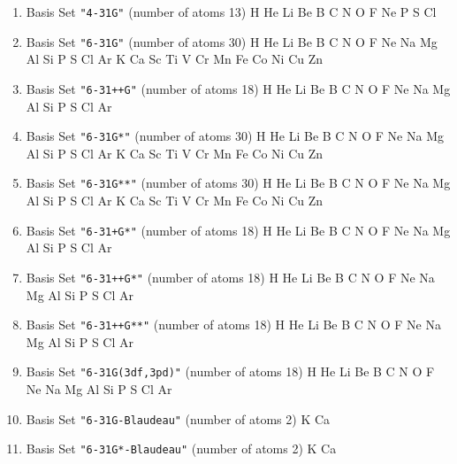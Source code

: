 \begin{enumerate}
\item Basis Set \verb#"4-31G"# (number of atoms 13)  \newline 
  H He Li Be B C N O F Ne P S Cl


\item Basis Set \verb#"6-31G"# (number of atoms 30)  \newline 
  H He Li Be B C N O F Ne Na Mg Al Si P S Cl Ar K Ca Sc Ti V Cr Mn
 Fe Co Ni Cu Zn


\item Basis Set \verb#"6-31++G"# (number of atoms 18)  \newline 
  H He Li Be B C N O F Ne Na Mg Al Si P S Cl Ar


\item Basis Set \verb#"6-31G*"# (number of atoms 30)  \newline 
  H He Li Be B C N O F Ne Na Mg Al Si P S Cl Ar K Ca Sc Ti V Cr Mn
 Fe Co Ni Cu Zn


\item Basis Set \verb#"6-31G**"# (number of atoms 30)  \newline 
  H He Li Be B C N O F Ne Na Mg Al Si P S Cl Ar K Ca Sc Ti V Cr Mn
 Fe Co Ni Cu Zn


\item Basis Set \verb#"6-31+G*"# (number of atoms 18)  \newline 
  H He Li Be B C N O F Ne Na Mg Al Si P S Cl Ar


\item Basis Set \verb#"6-31++G*"# (number of atoms 18)  \newline 
  H He Li Be B C N O F Ne Na Mg Al Si P S Cl Ar


\item Basis Set \verb#"6-31++G**"# (number of atoms 18)  \newline 
  H He Li Be B C N O F Ne Na Mg Al Si P S Cl Ar


\item Basis Set \verb#"6-31G(3df,3pd)"# (number of atoms 18)  \newline 
  H He Li Be B C N O F Ne Na Mg Al Si P S Cl Ar


\item Basis Set \verb#"6-31G-Blaudeau"# (number of atoms 2)  \newline 
  K Ca


\item Basis Set \verb#"6-31G*-Blaudeau"# (number of atoms 2)  \newline 
  K Ca



\end{enumerate}
